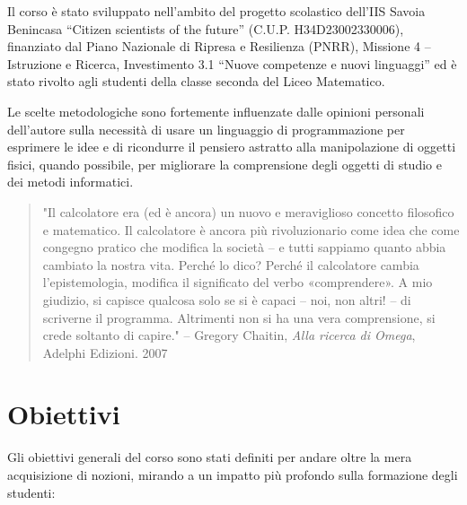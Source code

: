 \documentclass[withtimes]{easychair}
\begin{document}
Il corso è stato sviluppato nell'ambito del progetto scolastico dell'IIS Savoia Benincasa ``Citizen scientists of the future'' (C.U.P. H34D23002330006), finanziato dal Piano Nazionale di Ripresa e Resilienza (PNRR), Missione 4 -- Istruzione e Ricerca, Investimento 3.1 ``Nuove competenze e nuovi linguaggi'' ed è stato rivolto agli studenti della classe seconda del Liceo Matematico.

Le scelte metodologiche sono fortemente influenzate dalle opinioni personali dell'autore sulla necessità di usare un linguaggio di programmazione per esprimere le idee e di ricondurre il pensiero astratto alla manipolazione di oggetti fisici, quando possibile, per migliorare la comprensione degli oggetti di studio e dei metodi informatici.

\begin{quote}
    "Il calcolatore era (ed è ancora) un nuovo e meraviglioso concetto filosofico e matematico. Il calcolatore è ancora più rivoluzionario come idea che come congegno pratico che modifica la società -- e tutti sappiamo quanto abbia cambiato la nostra vita. Perché lo dico? Perché il calcolatore cambia l'epistemologia, modifica il significato del verbo «comprendere». A mio giudizio, si capisce qualcosa solo se si è capaci -- noi, non altri! -- di scriverne il programma. Altrimenti non si ha una vera comprensione, si crede soltanto di capire."
    \small{-- Gregory Chaitin, \textit{Alla ricerca di Omega}, Adelphi Edizioni. 2007}
\end{quote}

\section{Obiettivi}\label{obiettivi-del-corso}

Gli obiettivi generali del corso sono stati definiti per andare oltre la mera acquisizione di nozioni, mirando a un impatto più profondo sulla formazione degli studenti:
\end{document}
